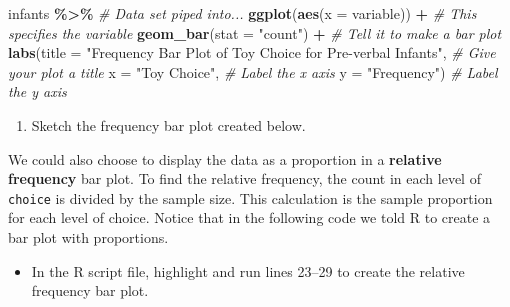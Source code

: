 \documentclass[
]{report}
\newenvironment{Shaded}{\begin{snugshade}}{\end{snugshade}}
\newcommand{\AttributeTok}[1]{\textcolor[rgb]{0.13,0.29,0.53}{#1}}
\newcommand{\CommentTok}[1]{\textcolor[rgb]{0.56,0.35,0.01}{\textit{#1}}}
\newcommand{\FunctionTok}[1]{\textcolor[rgb]{0.13,0.29,0.53}{\textbf{#1}}}
\newcommand{\NormalTok}[1]{#1}
\newcommand{\SpecialCharTok}[1]{\textcolor[rgb]{0.81,0.36,0.00}{\textbf{#1}}}
\newcommand{\StringTok}[1]{\textcolor[rgb]{0.31,0.60,0.02}{#1}}
\providecommand{\tightlist}{%
  \setlength{\itemsep}{0pt}\setlength{\parskip}{0pt}}
\begin{document}
\begin{Shaded}
\begin{Highlighting}[]
\NormalTok{infants }\SpecialCharTok{\%\textgreater{}\%} \CommentTok{\# Data set piped into...}
    \FunctionTok{ggplot}\NormalTok{(}\FunctionTok{aes}\NormalTok{(}\AttributeTok{x =}\NormalTok{ variable)) }\SpecialCharTok{+}   \CommentTok{\# This specifies the variable}
    \FunctionTok{geom\_bar}\NormalTok{(}\AttributeTok{stat =} \StringTok{"count"}\NormalTok{) }\SpecialCharTok{+}  \CommentTok{\# Tell it to make a bar plot}
    \FunctionTok{labs}\NormalTok{(}\AttributeTok{title =} \StringTok{"Frequency Bar Plot of Toy Choice for Pre{-}verbal Infants"}\NormalTok{,  }
       \CommentTok{\# Give your plot a title}
       \AttributeTok{x =} \StringTok{"Toy Choice"}\NormalTok{,   }\CommentTok{\# Label the x axis}
       \AttributeTok{y =} \StringTok{"Frequency"}\NormalTok{)  }\CommentTok{\# Label the y axis}
\end{Highlighting}
\end{Shaded}

\begin{enumerate}
\def\labelenumi{\arabic{enumi}.}
\setcounter{enumi}{3}
\tightlist
\item
  Sketch the frequency bar plot created below.
\end{enumerate}

\vspace{1.8in}

We could also choose to display the data as a proportion in a \textbf{relative frequency} bar plot. To find the relative frequency, the count in each level of \texttt{choice} is divided by the sample size. This calculation is the sample proportion for each level of choice. Notice that in the following code we told R to create a bar plot with proportions.

\begin{itemize}
\tightlist
\item
  In the R script file, highlight and run lines 23--29 to create the relative frequency bar plot.
\end{itemize}
\end{document}
